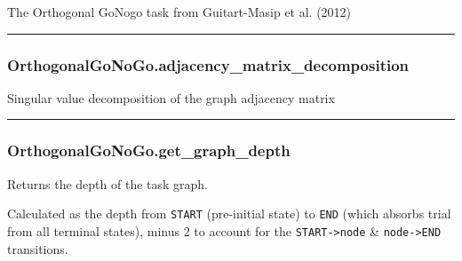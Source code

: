 \begin{Shaded}
\begin{Highlighting}[]
\end{Highlighting}
\end{Shaded}

The Orthogonal GoNogo task from Guitart-Masip et al. (2012)

\begin{center}\rule{0.5\linewidth}{\linethickness}\end{center}

\subsubsection{OrthogonalGoNoGo.adjacency\_matrix\_decomposition}\label{orthogonalgonogo.adjacency_matrix_decomposition}

\begin{Shaded}
\begin{Highlighting}[]
\NormalTok{)}
\end{Highlighting}
\end{Shaded}

Singular value decomposition of the graph adjacency matrix

\begin{center}\rule{0.5\linewidth}{\linethickness}\end{center}

\subsubsection{OrthogonalGoNoGo.get\_graph\_depth}\label{orthogonalgonogo.get_graph_depth}

\begin{Shaded}
\begin{Highlighting}[]
\NormalTok{)}
\end{Highlighting}
\end{Shaded}

Returns the depth of the task graph.

Calculated as the depth from \texttt{START} (pre-initial state) to
\texttt{END} (which absorbs trial from all terminal states), minus 2 to
account for the \texttt{START-\textgreater{}node} \&
\texttt{node-\textgreater{}END} transitions.

